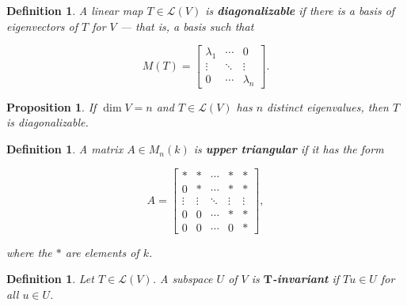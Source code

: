 \documentclass{article}
\theoremstyle{colontheorem}
\newtheorem{proposition}[theorem]{Proposition}
\newtheorem{definition}[theorem]{Definition}
\newenvironment{Proposition}
{
	\begin{mdframed}[backgroundcolor=TheoremOrange!10]
	\begin{proposition}
}
{
	\end{proposition}
	\end{mdframed}
	
	\vspace{.15in}
}
\newenvironment{Def}
{
	\begin{mdframed}[backgroundcolor=DefGreen!10]
	\begin{definition}
}
{
	\end{definition}
	\end{mdframed}
	
	\vspace{.15in}
}
\begin{document}
\begin{Def}
	
	A linear map $T \in \mathcal{L}(V)$ is \textbf{diagonalizable} if there is a basis of eigenvectors of $T$ for $V$ --- that is, a basis such that
	
	$$
		M(T) = \begin{bmatrix}
			\lambda_1 & \cdots & 0\\
			\vdots & \ddots & \vdots\\
			0 & \cdots & \lambda_n
		\end{bmatrix}.
	$$
	
\end{Def}



\begin{Proposition}
	
	If $\dim V = n$ and $T \in \mathcal{L}(V)$ has $n$ distinct eigenvalues, then $T$ is diagonalizable.
	
\end{Proposition}



\begin{Def}
	
	A matrix $A \in M_n(k)$ is \textbf{upper triangular} if it has the form
	
	$$
		A = \begin{bmatrix}
			* & * & \cdots & * & *\\
			0 & * & \cdots & * & *\\
			\vdots & \vdots & \ddots & \vdots & \vdots\\
			0 & 0 & \cdots & * & *\\
			0 & 0 & \cdots & 0 & *
		\end{bmatrix},
	$$
	
	where the $*$ are elements of $k$.
	
\end{Def}



\begin{Def}
	
	Let $T \in \mathcal{L}(V)$. A subspace $U$ of $V$ is \textbf{$\mathbf{T}$-invariant} if $Tu \in U$ for all $u \in U$.
	
\end{Def}
\end{document}
